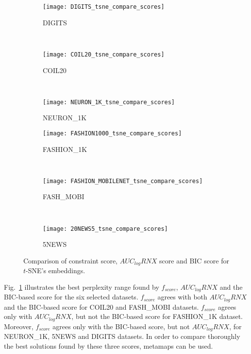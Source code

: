 \begin{figure}[ht!]
    \centering
    \begin{subfigure}[b]{0.3\linewidth}
        \centering
        \texttt{[image: DIGITS\_tsne\_compare\_scores]}
        \caption{DIGITS}
    \end{subfigure}
    ~
    \begin{subfigure}[b]{0.3\linewidth}
        \texttt{[image: COIL20\_tsne\_compare\_scores]}
        \caption{COIL20}
    \end{subfigure}
    ~
    \begin{subfigure}[b]{0.3\linewidth}
        \texttt{[image: NEURON\_1K\_tsne\_compare\_scores]}
        \caption{NEURON\_1K}
    \end{subfigure}
    \vfill
    \begin{subfigure}[b]{0.3\linewidth}
        \centering
        \texttt{[image: FASHION1000\_tsne\_compare\_scores]}
        \caption{FASHION\_1K}
    \end{subfigure}
    ~
    \begin{subfigure}[b]{0.3\linewidth}
        \texttt{[image: FASHION\_MOBILENET\_tsne\_compare\_scores]}
        \caption{FASH\_MOBI}
    \end{subfigure}
    ~
    \begin{subfigure}[b]{0.3\linewidth}
        \texttt{[image: 20NEWS5\_tsne\_compare\_scores]}
        \caption{5NEWS}
    \end{subfigure}
    \caption{Comparison of constraint score, $AUC_{log}RNX$ score and BIC score for $t$-SNE's embeddings.}
    \label{fig:tsne:compare}
\end{figure}

Fig.~\ref{fig:tsne:compare} illustrates the best perplexity range found by $f_{score}$, $AUC_{log}RNX$ and the BIC-based score for the six selected datasets.
$f_{score}$ agrees with both $AUC_{log}RNX$ and the BIC-based score for COIL20 and {FASH\_MOBI} datasets.
$f_{score}$ agrees only with $AUC_{log}RNX$, but not the BIC-based score for {FASHION\_1K} dataset.
Moreover, $f_{score}$ agrees only with the BIC-based score, but not $AUC_{log}RNX$, for {NEURON\_1K}, 5NEWS and DIGITS datasets.
In order to compare thoroughly the best solutions found by these three scores, metamaps can be used.

